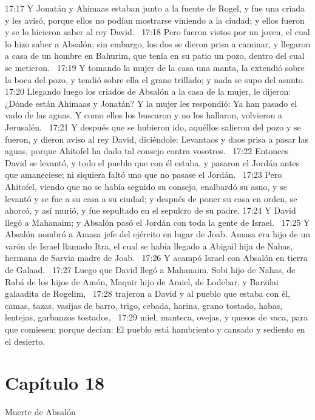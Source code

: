 17:17 Y Jonatán y Ahimaas estaban junto a la fuente de Rogel, y fue una criada y les avisó, porque ellos no podían mostrarse viniendo a la ciudad; y ellos fueron y se lo hicieron saber al rey David.  
17:18 Pero fueron vistos por un joven, el cual lo hizo saber a Absalón; sin embargo, los dos se dieron prisa a caminar, y llegaron a casa de un hombre en Bahurim, que tenía en su patio un pozo, dentro del cual se metieron.  
17:19 Y tomando la mujer de la casa una manta, la extendió sobre la boca del pozo, y tendió sobre ella el grano trillado; y nada se supo del asunto.  
17:20 Llegando luego los criados de Absalón a la casa de la mujer, le dijeron: ¿Dónde están Ahimaas y Jonatán? Y la mujer les respondió: Ya han pasado el vado de las aguas. Y como ellos los buscaron y no los hallaron, volvieron a Jerusalén.  
17:21 Y después que se hubieron ido, aquéllos salieron del pozo y se fueron, y dieron aviso al rey David, diciéndole: Levantaos y daos prisa a pasar las aguas, porque Ahitofel ha dado tal consejo contra vosotros.  
17:22 Entonces David se levantó, y todo el pueblo que con él estaba, y pasaron el Jordán antes que amaneciese; ni siquiera faltó uno que no pasase el Jordán.  
17:23 Pero Ahitofel, viendo que no se había seguido su consejo, enalbardó su asno, y se levantó y se fue a su casa a su ciudad; y después de poner su casa en orden, se ahorcó, y así murió, y fue sepultado en el sepulcro de su padre. 
17:24 Y David llegó a Mahanaim; y Absalón pasó el Jordán con toda la gente de Israel.  
17:25 Y Absalón nombró a Amasa jefe del ejército en lugar de Joab. Amasa era hijo de un varón de Israel llamado Itra, el cual se había llegado a Abigail hija de Nahas, hermana de Sarvia madre de Joab.  
17:26 Y acampó Israel con Absalón en tierra de Galaad.  
17:27 Luego que David llegó a Mahanaim, Sobi hijo de Nahas, de Rabá de los hijos de Amón, Maquir hijo de Amiel, de Lodebar, y Barzilai galaadita de Rogelim,  
17:28 trajeron a David y al pueblo que estaba con él, camas, tazas, vasijas de barro, trigo, cebada, harina, grano tostado, habas, lentejas, garbanzos tostados,  
17:29 miel, manteca, ovejas, y quesos de vaca, para que comiesen; porque decían: El pueblo está hambriento y cansado y sediento en el desierto.  
\section*{Capítulo 18}
Muerte de Absalón  

